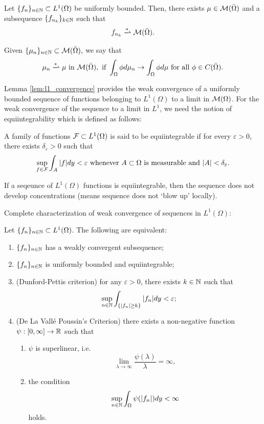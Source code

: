 \begin{lem}\label{lem:l1_convergence}
    Let $\{f_n\}_{n \in \mathbb{N}} \subset L^1(\Omega)$ be uniformly bounded. Then, there exists $\mu \in {\cal M}(\bar{\Omega})$ and a subsequence $\{f_{n_k}\}_{k \in \mathbb{N}}$ such that
    $$ f_{n_k} \xrightharpoonup{*} {\cal M}(\bar{\Omega}).$$    
\end{lem}
\begin{rem}
    Given $\{\mu_n\}_{n\in \mathbb{N}} \subset {\cal M}({\bar{\Omega}}),$ we say that
    $$\mu_n \xrightharpoonup{*} \mu \text{ in } {\cal M}(\bar{\Omega}), \text{ if } \int_{\Omega} \phi d\mu_n \to \int_{\Omega} \phi d\mu \text{ for all } \phi \in C(\bar{\Omega}).$$    
\end{rem}

Lemma \ref{lem:l1_convergence} provides the weak convergence of a uniformly bounded sequence of functions belonging to $L^1(\Omega)$ to a limit in ${\cal M}(\Omega)$. For the weak convergence of the sequence to a limit in $L^1$, we need the notion of equiintegrability which is defined as follows:

\begin{defn}[Equiintegrability]
    A family of functions ${\cal F} \subset L^1(\Omega)$ is said to be equiintegrable if for every $\varepsilon > 0$, there exists $\delta_{\varepsilon} > 0$ such that
    $$ \sup_{f \in {\cal F}} \int_A |f| dy < \varepsilon \text{ whenever } A \subset \Omega \text{ is measurable and } |A| < \delta_{\varepsilon}.$$ 
\end{defn}

If a seqeunce of $L^1(\Omega)$ functions is equiintegrable, then the sequence does not develop concentrations (means sequence does not `blow up' locally).

Complete characterization of weak convergence of sequences in $L^1(\Omega)$:
\begin{lem}
    Let $\{f_n\}_{n \in \mathbb{N}} \subset L^1(\Omega)$. The following are equivalent:
    \begin{enumerate}
        \item $\{f_n\}_{n \in \mathbb{N}}$ has a weakly convergent subsequence;
        \item $\{f_n\}_{n \in \mathbb{N}}$ is uniformly bounded and equiintegrable;
        \item (Dunford-Pettis criterion) for any $\varepsilon > 0$, there exists $k \in \mathbb{N}$ such that $$ \sup_{n \in \mathbb{N}} \int_{\{|f_n| \geq k\}} |f_n| dy < \varepsilon;$$
        \item (De La Vall\'e Poussin's Criterion) there exists a non-negative function $\psi:[0, \infty] \to \mathbb{R}$ such that \begin{enumerate}
            \item $\psi$ is superlinear, i.e. $$ \lim_{\lambda \to \infty} \frac{\psi(\lambda)}{\lambda} = \infty, $$
            \item the condition $$\sup_{n \in \mathbb{N}} \int_{\Omega} \psi(|f_n|) dy < \infty$$ holds.
        \end{enumerate}
    \end{enumerate}
\end{lem}



